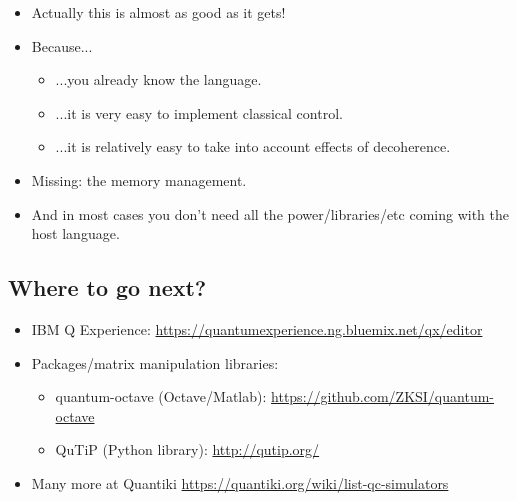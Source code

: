 \documentclass{beamer}
\begin{document}
\begin{frame}{\insertsection}{\insertsubsection}
    \begin{itemize}
        \item<1-> Actually this is almost as good as it gets!
        \item<2-> Because...
        \begin{itemize}
            \item<3->  ...you already know the language.
            \item<4-> ...it is very easy to implement 
            classical control.
            \item<5-> ...it is relatively easy to take into account effects of 
            decoherence.
        \end{itemize}
        \item<6-> Missing: the memory management.
        \item<7-> And in most cases you don't need all the power/libraries/etc 
        coming with the host language.
    \end{itemize}
\end{frame}

\subsection{Where to go next?}
\begin{frame}{\insertsection}{\insertsubsection}
    \begin{itemize}
    \item<1-> IBM Q Experience: 
    {\small\url{https://quantumexperience.ng.bluemix.net/qx/editor}}
    \item<2-> Packages/matrix manipulation libraries:
    \begin{itemize}
        \item<3-> quantum-octave (Octave/Matlab): 
        {\small \url{https://github.com/ZKSI/quantum-octave}}
        \item<4-> QuTiP (Python library): {\small\url{http://qutip.org/}}
    \end{itemize}
    \item<5-> Many more at Quantiki 
    \url{https://quantiki.org/wiki/list-qc-simulators}
    \end{itemize}
\end{frame}
\end{document}
